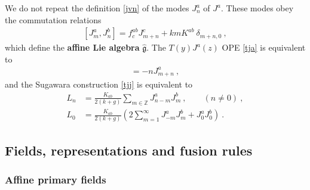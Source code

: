 \documentclass[12pt, a4paper, notitlepage, twoside]{report}
\numberwithin{equation}{section}
\theoremstyle{break}
\begin{document}
We do not repeat the definition \eqref{jvn} of the modes $J^a_n$ of $J^a$.
These modes obey the commutation relations
\begin{align}
 \boxed{[J^a_m,J^b_n] =   f^{ab}_c J^c_{m+n} +kmK^{ab}\ \delta_{m+n,0}} \ , 
\label{jam}
\end{align}
which define the \textbf{\boldmath affine Lie algebra} $\hat{\mathfrak{g}}$. 
The $T(y)J^a(z)$ OPE \eqref{tja} is equivalent to
\begin{align}
 [L_m,J^a_n] = -nJ^a_{m+n}\ ,
\end{align}
and the Sugawara construction \eqref{tjj} is equivalent to 
\begin{align}
 L_n &= \frac{K_{ab}}{2(k+g)} \sum_{m\in{\mathbb{Z}}} J^a_{n-m}J^b_m\ , \qquad (n\neq 0)\ ,
\label{ljj}
\\
L_0 & = \frac{K_{ab}}{2(k+g)}\left(2\sum_{m=1}^\infty J^a_{-m}J^b_m + J^a_0J^b_0\right)\ .
\label{lzjj}
\end{align}

\subsection{Fields, representations and fusion rules}
 
\subsubsection{Affine primary fields} 
 
\end{document}
